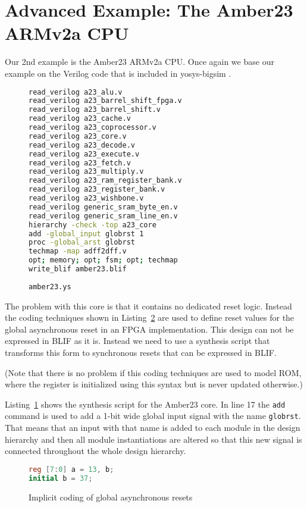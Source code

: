 \documentclass[9pt,technote,a4paper]{IEEEtran}
\begin{document}
\section{Advanced Example: The Amber23 ARMv2a CPU}

Our 2nd example is the Amber23 \cite{amber}
ARMv2a CPU. Once again we base our example on the Verilog code that is included
in yosys-bigsim \cite{bigsim}.

\begin{figure}[b!]
\begin{lstlisting}[language=sh]
read_verilog a23_alu.v
read_verilog a23_barrel_shift_fpga.v
read_verilog a23_barrel_shift.v
read_verilog a23_cache.v
read_verilog a23_coprocessor.v
read_verilog a23_core.v
read_verilog a23_decode.v
read_verilog a23_execute.v
read_verilog a23_fetch.v
read_verilog a23_multiply.v
read_verilog a23_ram_register_bank.v
read_verilog a23_register_bank.v
read_verilog a23_wishbone.v
read_verilog generic_sram_byte_en.v
read_verilog generic_sram_line_en.v
hierarchy -check -top a23_core
add -global_input globrst 1
proc -global_arst globrst
techmap -map adff2dff.v
opt; memory; opt; fsm; opt; techmap
write_blif amber23.blif
\end{lstlisting}
 \renewcommand{\figurename}{Listing}
\caption{\tt amber23.ys}
\label{aber23.ys}
\end{figure}

The problem with this core is that it contains no dedicated reset logic.
Instead the coding techniques shown in Listing~\ref{glob_arst} are used to
define reset values for the global asynchronous reset in an FPGA
implementation. This design can not be expressed in BLIF as it is. Instead we
need to use a synthesis script that transforms this form to synchronous resets that
can be expressed in BLIF.

(Note that there is no problem if this coding techniques are used to model
ROM, where the register is initialized using this syntax but is never updated
otherwise.)

\medskip

Listing~\ref{aber23.ys} shows the synthesis script for the Amber23 core. In
line 17 the {\tt add} command is used to add a 1-bit wide global input signal
with the name {\tt globrst}. That means that an input with that name is added
to each module in the design hierarchy and then all module instantiations are
altered so that this new signal is connected throughout the whole design
hierarchy.

\begin{figure}[t!]
\begin{lstlisting}[language=Verilog]
reg [7:0] a = 13, b;
initial b = 37;
\end{lstlisting}
 \renewcommand{\figurename}{Listing}
\caption{Implicit coding of global asynchronous resets}
\label{glob_arst}
\end{figure}
\end{document}
